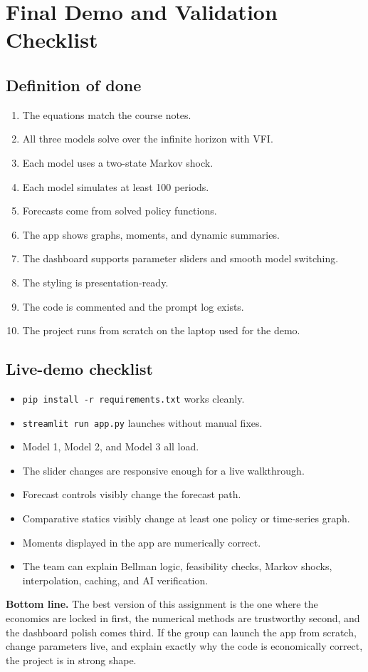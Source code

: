 \documentclass[11pt]{article}
\begin{document}
\section{Final Demo and Validation Checklist}

\subsection{Definition of done}
\begin{enumerate}[label=\textbf{\arabic*.}]
    \item The equations match the course notes.
    \item All three models solve over the infinite horizon with VFI.
    \item Each model uses a two-state Markov shock.
    \item Each model simulates at least 100 periods.
    \item Forecasts come from solved policy functions.
    \item The app shows graphs, moments, and dynamic summaries.
    \item The dashboard supports parameter sliders and smooth model switching.
    \item The styling is presentation-ready.
    \item The code is commented and the prompt log exists.
    \item The project runs from scratch on the laptop used for the demo.
\end{enumerate}

\subsection{Live-demo checklist}
\begin{itemize}
    \item \texttt{pip install -r requirements.txt} works cleanly.
    \item \texttt{streamlit run app.py} launches without manual fixes.
    \item Model 1, Model 2, and Model 3 all load.
    \item The slider changes are responsive enough for a live walkthrough.
    \item Forecast controls visibly change the forecast path.
    \item Comparative statics visibly change at least one policy or time-series graph.
    \item Moments displayed in the app are numerically correct.
    \item The team can explain Bellman logic, feasibility checks, Markov shocks, interpolation, caching, and AI verification.
\end{itemize}

\begin{goalbox}
\textbf{Bottom line.} The best version of this assignment is the one where the economics are locked in first, the numerical methods are trustworthy second, and the dashboard polish comes third. If the group can launch the app from scratch, change parameters live, and explain exactly why the code is economically correct, the project is in strong shape.
\end{goalbox}
\end{document}
